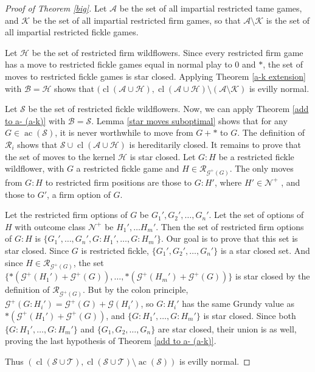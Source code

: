 \documentclass{amsart}
\theoremstyle{plain}
\theoremstyle{definition}
\theoremstyle{remark}
\numberwithin{equation}{section}
\numberwithin{thm}{section}
\DeclareMathOperator{\cl}{cl}
\DeclareMathOperator{\ac}{ac}
\begin{document}
\begin{proof}[Proof of Theorem \ref{big}]
Let $\mathscr{A}$ be the set of all impartial restricted tame games, and $ \mathscr{K}$ be the set of all impartial restricted firm games, so that $\mathscr{A} \setminus \mathscr{K}$ is the set of all impartial restricted fickle games.

Let $\mathscr{H}$ be the set of restricted firm wildflowers. Since every restricted firm game has a move to restricted fickle games equal in normal play to $0$ and $*$, the set of moves to restricted fickle games is star closed. Applying Theorem \ref{a-k extension} with $\mathscr{B} = \mathscr{H}$ shows that $(\cl(\mathscr{A} \cup \mathscr{H}),\cl(\mathscr{A} \cup \mathcal{H}) \setminus (\mathscr{A} \setminus \mathscr{K} )$ is evilly normal.

Let $\mathscr{S}$ be the set of restricted fickle wildflowers. Now, we can apply Theorem \ref{add to a- (a-k)} with $\mathscr{B} = \mathscr{S}$. Lemma \ref{star moves suboptimal} shows that for any $G \in \ac (\mathscr{S})$, it is never worthwhile to move from $G+*$ to $G$. The definition of $\mathscr{R}_i$ shows that $ \mathscr{S} \cup \cl(\mathscr{A} \cup \mathscr{H})  $ is hereditarily closed. It remains to prove that the set of moves to the kernel $\mathscr{H}$ is star closed. Let $G:H$ be a restricted fickle wildflower, with $G$ a restricted fickle game and $H \in \mathscr{R}_{\mathcal{G}^+(G)}$. The only moves from $G:H$ to restricted firm positions are those to $G:H'$, where $H' \in \mathcal{N}^+$ , and those to $G'$, a firm option of $G$. 

Let the restricted firm options of $G$ be $G_1',G_2',\dots,G_n'$. Let the set of options of $H$ with outcome class $\mathcal{N}^+$ be $H_1' ,\dots H_m'$. Then the set of restricted firm options of $G:H$ is $\{G_1',\dots,G_n',G:H_1',\dots,G:H_m' \}$. Our goal is to prove that this set is star closed.
Since $G$ is restricted fickle, $\{G_1',G_2',\dots,G_n'\}$ is a star closed set.
And since $H \in \mathscr{R}_{\mathcal{G}^+(G)}$, the set $\{ *(\mathcal{G}^+(H_1')+\mathcal{G}^+(G)), \dots, *(\mathcal{G}^+(H_m')+\mathcal{G}^+(G) )\}$ is star closed by the definition of $\mathscr{R}_{\mathcal{G}^+(G)}$. But by the colon principle, $\mathcal{G}^+(G:H_i') = \mathcal{G}^+(G) + \mathcal{G}(H_i')$, so $G:H_i'$ has the same Grundy value as $*(\mathcal{G}^+(H_1')+\mathcal{G}^+(G))$, and $\{G:H_1', \dots,G:H_m'\}$ is star closed. Since both $\{G:H_1', \dots,G:H_m'\}$ and  $\{G_1,G_2,\dots,G_n\}$ are star closed, their union is as well, proving the last hypothesis of Theorem \ref{add to a- (a-k)}.

Thus $(\cl(\mathscr{S} \cup \mathscr{T}),\cl(\mathscr{S} \cup \mathscr{T}) \setminus \ac(\mathscr{S}))$ is evilly normal.
\end{proof}
\end{document}
